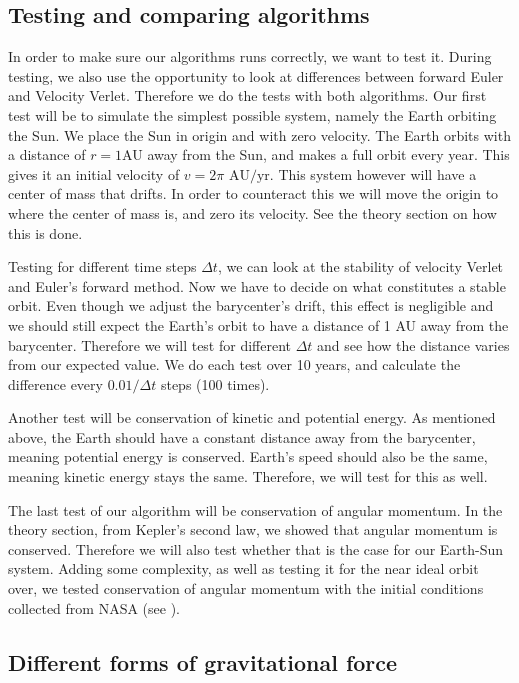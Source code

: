 \documentclass[reprint, english,notitlepage,nofootinbib]{revtex4-1}  %
\begin{document}
\subsection{Testing and comparing algorithms}

In order to make sure our algorithms runs correctly, we want to test it. During testing, we also use the opportunity to look at differences between forward Euler and Velocity Verlet. Therefore we do the tests with both algorithms. Our first test will be to simulate the simplest possible system, namely the Earth orbiting the Sun. We place the Sun in origin and with zero velocity. The Earth orbits with a distance of $r=1$AU away from the Sun, and makes a full orbit every year. This gives it an initial velocity of $v = 2\pi \text{ AU}/\text{yr}.$ This system however will have a center of mass that drifts. In order to counteract this we will move the origin to where the center of mass is, and zero its velocity. See the theory section on how this is done.

Testing for different time steps $\Delta t$, we can look at the stability of velocity Verlet and Euler's forward method. Now we have to decide on what constitutes a stable orbit. Even though we adjust the barycenter's drift, this effect is negligible and we should still expect the Earth's orbit to have a distance of 1 AU away from the barycenter. Therefore we will test for different $\Delta t$ and see how the distance varies from our expected value. We do each test over 10 years, and calculate the difference every $0.01/\Delta t$ steps (100 times).

Another test will be conservation of kinetic and potential energy. As mentioned above, the Earth should have a constant distance away from the barycenter, meaning potential energy is conserved. Earth's speed should also be the same, meaning kinetic energy stays the same. Therefore, we will test for this as well.

The last test of our algorithm will be conservation of angular momentum. In the theory section, from Kepler's second law, we showed that angular momentum is conserved. Therefore we will also test whether that is the case for our Earth-Sun system. Adding some complexity, as well as testing it for the near ideal orbit over, we tested conservation of angular momentum with the initial conditions collected from NASA (see \citep{NASA}).


\subsection{Different forms of gravitational force}
\end{document}
